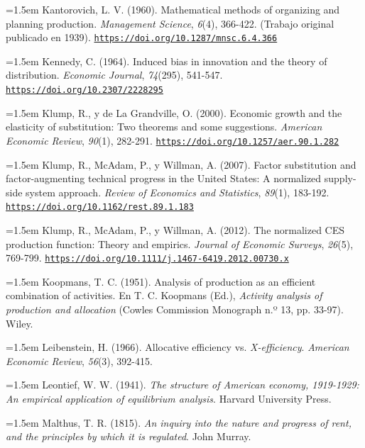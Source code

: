 \documentclass[10pt,a4paper]{article}
\begin{document}
\noindent\hangindent=1.5em Kantorovich, L. V. (1960). Mathematical methods of organizing and planning production. \textit{Management Science}, \textit{6}(4), 366-422. (Trabajo original publicado en 1939). \href{https://doi.org/10.1287/mnsc.6.4.366}{\nolinkurl{https://doi.org/10.1287/mnsc.6.4.366}}

\noindent\hangindent=1.5em Kennedy, C. (1964). Induced bias in innovation and the theory of distribution. \textit{Economic Journal}, \textit{74}(295), 541-547. \href{https://doi.org/10.2307/2228295}{\nolinkurl{https://doi.org/10.2307/2228295}}

\noindent\hangindent=1.5em Klump, R., y de La Grandville, O. (2000). Economic growth and the elasticity of substitution: Two theorems and some suggestions. \textit{American Economic Review}, \textit{90}(1), 282-291. \href{https://doi.org/10.1257/aer.90.1.282}{\nolinkurl{https://doi.org/10.1257/aer.90.1.282}}

\noindent\hangindent=1.5em Klump, R., McAdam, P., y Willman, A. (2007). Factor substitution and factor-augmenting technical progress in the United States: A normalized supply-side system approach. \textit{Review of Economics and Statistics}, \textit{89}(1), 183-192. \href{https://doi.org/10.1162/rest.89.1.183}{\nolinkurl{https://doi.org/10.1162/rest.89.1.183}}

\noindent\hangindent=1.5em Klump, R., McAdam, P., y Willman, A. (2012). The normalized CES production function: Theory and empirics. \textit{Journal of Economic Surveys}, \textit{26}(5), 769-799. \href{https://doi.org/10.1111/j.1467-6419.2012.00730.x}{\nolinkurl{https://doi.org/10.1111/j.1467-6419.2012.00730.x}}

\noindent\hangindent=1.5em Koopmans, T. C. (1951). Analysis of production as an efficient combination of activities. En T. C. Koopmans (Ed.), \textit{Activity analysis of production and allocation} (Cowles Commission Monograph n.º 13, pp. 33-97). Wiley.

\noindent\hangindent=1.5em Leibenstein, H. (1966). Allocative efficiency vs. \textit{X-efficiency}. \textit{American Economic Review}, \textit{56}(3), 392-415.

\noindent\hangindent=1.5em Leontief, W. W. (1941). \textit{The structure of American economy, 1919-1929: An empirical application of equilibrium analysis}. Harvard University Press.

\noindent\hangindent=1.5em Malthus, T. R. (1815). \textit{An inquiry into the nature and progress of rent, and the principles by which it is regulated}. John Murray.
\end{document}
